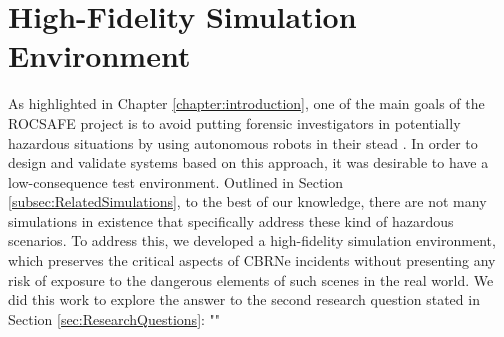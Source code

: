 \chapter{High-Fidelity Simulation Environment}\label{chap:HighFidelitySim}


As highlighted in Chapter \ref{chapter:introduction}, one of the main goals of the ROCSAFE project is to avoid putting forensic investigators in potentially hazardous situations by using autonomous robots in their stead \cite{Bagherzadeh2017ROCSAFE:Incidents}. In order to design and validate systems based on this approach, it was desirable to have a low-consequence test environment. Outlined in Section \ref{subsec:RelatedSimulations}, to the best of our knowledge, there are not many simulations in existence that specifically address these kind of hazardous scenarios. To address this, we developed a high-fidelity simulation environment, which preserves the critical aspects of CBRNe incidents without presenting any risk of exposure to the dangerous elements of such scenes in the real world. We did this work to explore the answer to the second research question stated in Section \ref{sec:ResearchQuestions}:
\newline
"\textit{}"\par

